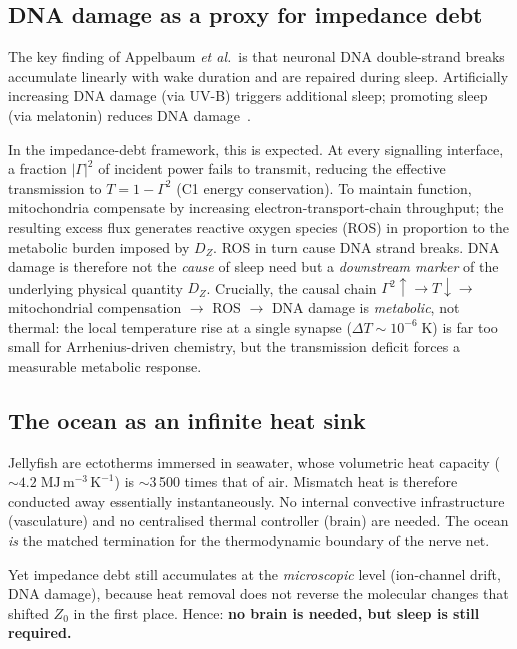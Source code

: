 ﻿\documentclass[aps,pre,twocolumn,superscriptaddress,floatfix]{revtex4-2}
\begin{document}
\subsection{DNA damage as a proxy for impedance debt}

The key finding of Appelbaum \emph{et al.}\ is that
neuronal DNA double-strand breaks accumulate linearly
with wake duration and are repaired during sleep.
Artificially increasing DNA damage (via UV-B) triggers
additional sleep; promoting sleep (via melatonin) reduces
DNA damage~\cite{Appelbaum2026}.

In the impedance-debt framework, this is expected.
At every signalling interface, a fraction $|\Gamma|^2$
of incident power fails to transmit, reducing the
effective transmission to $T = 1 - \Gamma^2$ (C1 energy
conservation).
To maintain function, mitochondria compensate by
increasing electron-transport-chain throughput;
the resulting excess flux generates reactive oxygen
species (ROS) in proportion to the metabolic burden
imposed by $D_Z$.
ROS in turn cause DNA strand breaks.
DNA damage is therefore not the \emph{cause} of sleep need
but a \emph{downstream marker} of the underlying
physical quantity $D_Z$.
Crucially, the causal chain
$\Gamma^2{\uparrow} \to T{\downarrow} \to$
mitochondrial compensation $\to$ ROS $\to$ DNA damage
is \emph{metabolic}, not thermal:
the local temperature rise at a single synapse
($\Delta T \sim 10^{-6}\;$K) is far too small for
Arrhenius-driven chemistry, but the transmission
deficit forces a measurable metabolic response.

\subsection{The ocean as an infinite heat sink}
\label{sec:ocean-heat-sink}

Jellyfish are ectotherms immersed in seawater,
whose volumetric heat capacity
($\sim 4.2\;\mathrm{MJ\,m^{-3}\,K^{-1}}$)
is $\sim$3\,500 times that of air.
Mismatch heat is therefore conducted away essentially
instantaneously.
No internal convective infrastructure (vasculature)
and no centralised thermal controller (brain) are needed.
The ocean \emph{is} the matched termination for the
thermodynamic boundary of the nerve net.

Yet impedance debt still accumulates at the
\emph{microscopic} level (ion-channel drift, DNA damage),
because heat removal does not reverse the molecular
changes that shifted $Z_0$ in the first place.
Hence: \textbf{no brain is needed, but sleep is still required.}
\end{document}
